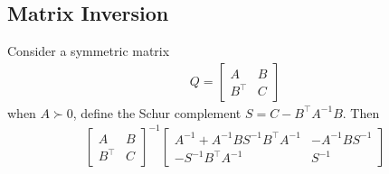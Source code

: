 \documentclass[12pt]{article}
\begin{document}
\subsection{Matrix Inversion}
Consider a symmetric matrix
\begin{align*}
  Q = \begin{bmatrix} A & B \\ B^\top & C \end{bmatrix}
\end{align*}
when \(A \succ 0\), define
the Schur complement \(S = C - B^\top A^{-1} B\).
Then
\begin{align*}
  \begin{bmatrix} A & B \\ B^\top & C \end{bmatrix}^{-1}
    \begin{bmatrix}
      A^{-1} + A^{-1} B S^{-1} B^\top A^{-1} & - A^{-1} B S^{-1} \\
      - S^{-1} B^\top A^{-1} & S^{-1}
    \end{bmatrix}
\end{align*}
\end{document}
